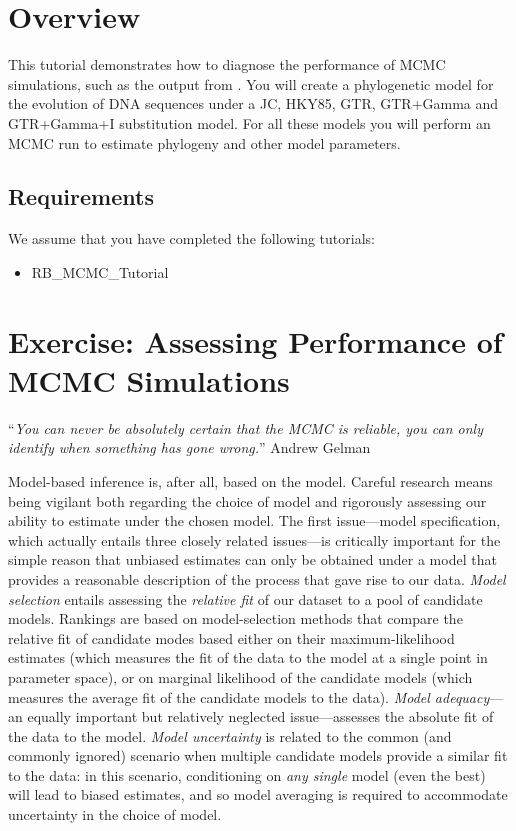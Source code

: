\section{Overview}


This tutorial demonstrates how to diagnose the performance of MCMC simulations, such as the output from \RevBayes.
You will create a phylogenetic model for the evolution of DNA sequences under a JC, HKY85, GTR, GTR+Gamma and GTR+Gamma+I substitution model.
For all these models you will perform an MCMC run to estimate phylogeny and other model parameters.

\subsection*{Requirements}
We assume that you have completed the following tutorials:
\begin{itemize}
\item RB\_MCMC\_Tutorial
\end{itemize}



\newpage
\FloatBarrier
\section{Exercise: Assessing Performance of MCMC Simulations}

``{\it You can never be absolutely certain that the MCMC is reliable, you can only identify when something has gone wrong.}'' Andrew Gelman

\bigskip
Model-based inference is, after all, based on the model.
Careful research means being vigilant both regarding the choice of model and rigorously assessing our ability to estimate under the chosen model. 
The first issue---model specification, which actually entails three closely related issues---is critically important for the simple reason that unbiased estimates can only be obtained under a model that provides a reasonable description of the process that gave rise to our data. 
{\it Model selection} entails assessing the {\it relative fit} of our dataset to a pool of candidate models. 
Rankings are based on model-selection methods that compare the relative fit of candidate modes based either on their maximum-likelihood estimates (which measures the fit of the data to the model at a single point in parameter space), or on marginal likelihood of the candidate models (which measures the average fit of the candidate models to the data). 
{\it Model adequacy}---an equally important but relatively neglected issue---assesses the absolute fit of the data to the model. 
{\it Model uncertainty} is related to the common (and commonly ignored) scenario when multiple candidate models provide a similar fit to the data: in this scenario, conditioning on {\it any single} model (even the best) will lead to biased estimates, and so model averaging is required to accommodate uncertainty in the choice of model.

